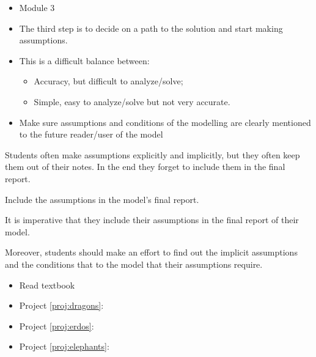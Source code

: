 \begin{lesson}

	\begin{itemize}
		\item Module 3
	\end{itemize}

	\begin{itemize}
		\item The third step is to decide on a path to the solution and start making assumptions.
		
		\item This is a difficult balance between:
		\begin{itemize}
			\item Accuracy, but difficult to analyze/solve;
			\item Simple, easy to analyze/solve but not very accurate.
		\end{itemize}

	\item Make sure assumptions and conditions of the modelling are clearly mentioned to the future reader/user of the model
	\end{itemize}
	
	

Students often make assumptions explicitly and implicitly, but they often keep them out of their notes. In the end they forget to include them in the final report.

\begin{annotation}
\begin{goals}
	Include the assumptions in the model's final report.
\end{goals}
\end{annotation}
It is imperative that they include their assumptions in the final report of their model.

Moreover, students should make an effort to find out the implicit assumptions and the conditions that to the model that their assumptions require.


\begin{itemize}
	\item Read textbook
\end{itemize}

\begin{itemize}
	\item Project \ref{proj:dragons}: \dragonstitle
	\item Project \ref{proj:erdos}: \erdostitle
	\item Project \ref{proj:elephants}: \elephantstitle
\end{itemize}


\end{lesson}
